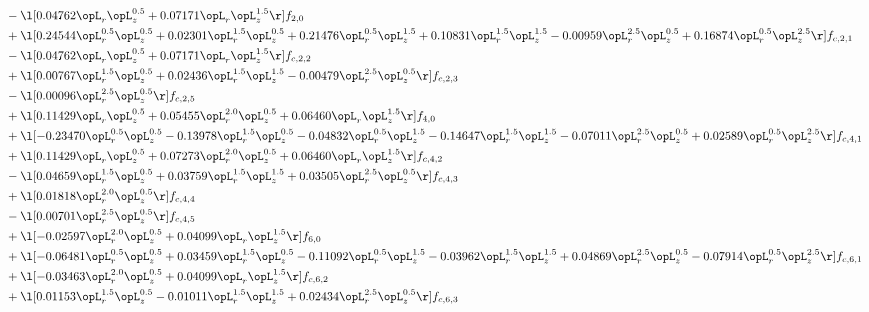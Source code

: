 \begin{alignat}{2}
& - \l[  0.04762 \opL_r \opL_z^{0.5} +  0.07171 \opL_r \opL_z^{1.5}  \r] f_{2,0} \nonumber \\ 
& + \l[  0.24544 \opL_r^{0.5} \opL_z^{0.5} +  0.02301 \opL_r^{1.5} \opL_z^{0.5} +  0.21476 \opL_r^{0.5} \opL_z^{1.5} +  0.10831 \opL_r^{1.5} \opL_z^{1.5}   -0.00959 \opL_r^{2.5} \opL_z^{0.5} +  0.16874 \opL_r^{0.5} \opL_z^{2.5}  \r] f_{c,2,1} \nonumber \\ 
& - \l[  0.04762 \opL_r \opL_z^{0.5} +  0.07171 \opL_r \opL_z^{1.5}  \r] f_{c,2,2} \nonumber \\ 
& + \l[  0.00767 \opL_r^{1.5} \opL_z^{0.5} +  0.02436 \opL_r^{1.5} \opL_z^{1.5}   -0.00479 \opL_r^{2.5} \opL_z^{0.5}  \r] f_{c,2,3} \nonumber \\ 
& - \l[  0.00096 \opL_r^{2.5} \opL_z^{0.5}  \r] f_{c,2,5} \nonumber \\ 
& + \l[  0.11429 \opL_r \opL_z^{0.5} +  0.05455 \opL_r^{2.0} \opL_z^{0.5} +  0.06460 \opL_r \opL_z^{1.5}  \r] f_{4,0} \nonumber \\ 
& + \l[  -0.23470 \opL_r^{0.5} \opL_z^{0.5}   -0.13978 \opL_r^{1.5} \opL_z^{0.5}   -0.04832 \opL_r^{0.5} \opL_z^{1.5}   -0.14647 \opL_r^{1.5} \opL_z^{1.5}   -0.07011 \opL_r^{2.5} \opL_z^{0.5} +  0.02589 \opL_r^{0.5} \opL_z^{2.5}  \r] f_{c,4,1} \nonumber \\ 
& + \l[  0.11429 \opL_r \opL_z^{0.5} +  0.07273 \opL_r^{2.0} \opL_z^{0.5} +  0.06460 \opL_r \opL_z^{1.5}  \r] f_{c,4,2} \nonumber \\ 
& - \l[  0.04659 \opL_r^{1.5} \opL_z^{0.5} +  0.03759 \opL_r^{1.5} \opL_z^{1.5} +  0.03505 \opL_r^{2.5} \opL_z^{0.5}  \r] f_{c,4,3} \nonumber \\ 
& + \l[  0.01818 \opL_r^{2.0} \opL_z^{0.5}  \r] f_{c,4,4} \nonumber \\ 
& - \l[  0.00701 \opL_r^{2.5} \opL_z^{0.5}  \r] f_{c,4,5} \nonumber \\ 
& + \l[  -0.02597 \opL_r^{2.0} \opL_z^{0.5} +  0.04099 \opL_r \opL_z^{1.5}  \r] f_{6,0} \nonumber \\ 
& + \l[  -0.06481 \opL_r^{0.5} \opL_z^{0.5} +  0.03459 \opL_r^{1.5} \opL_z^{0.5}   -0.11092 \opL_r^{0.5} \opL_z^{1.5}   -0.03962 \opL_r^{1.5} \opL_z^{1.5} +  0.04869 \opL_r^{2.5} \opL_z^{0.5}   -0.07914 \opL_r^{0.5} \opL_z^{2.5}  \r] f_{c,6,1} \nonumber \\ 
& + \l[  -0.03463 \opL_r^{2.0} \opL_z^{0.5} +  0.04099 \opL_r \opL_z^{1.5}  \r] f_{c,6,2} \nonumber \\ 
& + \l[  0.01153 \opL_r^{1.5} \opL_z^{0.5}   -0.01011 \opL_r^{1.5} \opL_z^{1.5} +  0.02434 \opL_r^{2.5} \opL_z^{0.5}  \r] f_{c,6,3} \nonumber \\ 

\end{alignat}

